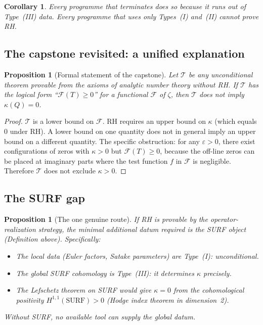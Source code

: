 \documentclass[11pt]{amsart}
\newtheorem{proposition}[theorem]{Proposition}
\newtheorem{corollary}[theorem]{Corollary}
\theoremstyle{definition}
\theoremstyle{remark}
\newcommand{\kap}{\kappa}
\newcommand{\eps}{\varepsilon}
\begin{document}
\begin{corollary}
Every programme that terminates does so because it runs out of Type~(III) data.
Every programme that uses only Types~(I) and~(II) cannot prove RH.
\end{corollary}

\subsection{The capstone revisited: a unified explanation}

\begin{proposition}[Formal statement of the capstone]
Let $\mathcal{T}$ be any unconditional theorem provable from the axioms of analytic
number theory without RH.  If $\mathcal{T}$ has the logical form
``$\mathcal{F}(T) \ge 0$'' for a functional $\mathcal{F}$ of $\zeta$, then
$\mathcal{T}$ does not imply $\kap(Q)=0$.
\end{proposition}

\begin{proof}
$\mathcal{T}$ is a lower bound on $\mathcal{F}$.  RH requires an upper bound on
$\kap$ (which equals 0 under RH).  A lower bound on one quantity does not in general
imply an upper bound on a different quantity.  The specific obstruction: for any
$\eps>0$, there exist configurations of zeros with $\kap>0$ but $\mathcal{F}(T)\ge 0$,
because the off-line zeros can be placed at imaginary parts where the test function
$f$ in $\mathcal{F}$ is negligible.  Therefore $\mathcal{T}$ does not exclude
$\kap>0$.
\end{proof}

\subsection{The SURF gap}

\begin{proposition}[The one genuine route]
If RH is provable by the operator-realization strategy, the minimal additional datum
required is the SURF object (Definition above).  Specifically:
\begin{itemize}
  \item The local data (Euler factors, Satake parameters) are Type~(I): unconditional.
  \item The global SURF cohomology is Type~(III): it determines $\kap$ precisely.
  \item The Lefschetz theorem on SURF would give $\kap=0$ from the cohomological
    positivity $H^{1,1}(\text{SURF}) > 0$ (Hodge index theorem in dimension~2).
\end{itemize}
Without SURF, no available tool can supply the global datum.
\end{proposition}
\end{document}
